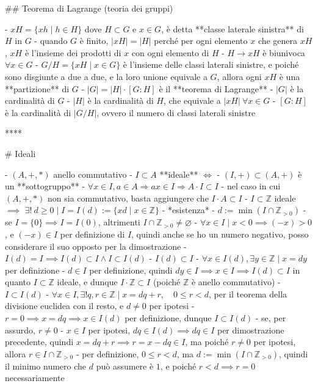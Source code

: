 ## Teorema di Lagrange (teoria dei gruppi)

- $xH = \{xh \mid h \in H\}$ dove $H \subset G$ e $x \in G$, è detta **classe laterale sinistra** di $H$ in $G$
  - quando $G$ è finito, $| xH | = | H |$ perché per ogni elemento $x$ che genera $xH$, $xH$ è l'insieme dei prodotti di $x$ con ogni elemento di $H$
    - $H \rightarrow xH$ è biunivoca $\forall x \in G$
  - $G / H = \{xH \mid x \in G\}$ è l'insieme delle classi laterali sinistre, e poiché sono disgiunte a due a due, e la loro unione equivale a $G$, allora ogni $xH$ è una **partizione** di $G$
  - $|G| = |H| \cdot [G : H]$ è il **teorema di Lagrange**
    - $|G|$ è la cardinalità di $G$
    - $|H|$ è la cardinalità di $H$, che equivale a $|xH| \ \forall x \in G$
    - $[G : H]$ è la cardinalità di $|G / H|$, ovvero il numero di classi laterali sinistre

****

# Ideali

- $(A, +, *)$ anello commutativo
- $I \subset A$ **ideale** $\iff$
  - $(I, +) \subset (A, +)$ è un **sottogruppo**
  - $\forall x \in I, a \in A \Rightarrow ax \in I \Rightarrow A \cdot I \subset I$
- nel caso in cui $(A, +, *)$ non sia commutativo, basta aggiungere che $I \cdot A \subset I$
- $I \subset \mathbb{Z}$ ideale $\implies$ \( \exists ! \ d \geq 0 \mid I=I(d):=\{x d \mid x \in \mathbb{Z}\} \)
  - *esistenza*
    - $d:=\min(I \cap \mathbb{Z}_{\gt 0})$
      - se $I = \{0\} \implies I = I(0)$, altrimenti \( I \cap \mathbb{Z}_{>0} \neq \varnothing \)
        - \( \forall x \in I \mid x < 0 \implies (-x)>0 \), e $(-x) \in I$ per definizione di $I$, quindi anche se ho un numero negativo, posso considerare il suo opposto per la dimostrazione
    - \( I(d)=I \implies I(d) \subset I \wedge I \subset I(d) \)
      - $I(d) \subset I$
        - $\forall x \in I(d), \exists y \in \mathbb{Z} \mid x = dy$ per definizione
        - $d \in I$ per definizione, quindi $dy \in I \implies x \in I \implies I(d) \subset I$ in quanto $I \subset \mathbb{Z}$ ideale, e dunque $I \cdot \mathbb{Z} \subset I$ (poiché $\mathbb{Z}$ è anello commutativo)
      - $I \subset I(d)$
        - \( \forall x \in I, \exists ! q,r \in \mathbb{Z} \mid x=d q+r, \quad 0 \leq r<d \), per il teorema della divisione euclidea con il resto, e $d\neq 0$ per ipotesi
          - $r = 0 \implies x = dq \implies x \in I(d)$ per definizione, dunque $I \subset I(d)$
          - se, per assurdo, $r \neq 0$
            - $x \in I$ per ipotesi, $dq \in I(d) \implies dq \in I$ per dimostrazione precedente, quindi $x = dq + r \implies r = x - dq \in I$, ma poiché $r \neq 0$ per ipotesi, allora $r \in I \cap \mathbb{Z}_{\gt 0}$
            - per definizione, $0 \le r \lt d$, ma $d:=\min(I \cap \mathbb{Z}_{\gt 0})$, quindi il minimo numero che $d$ può assumere è $1$, e poiché $r < d \implies r = 0$ necessariamente

